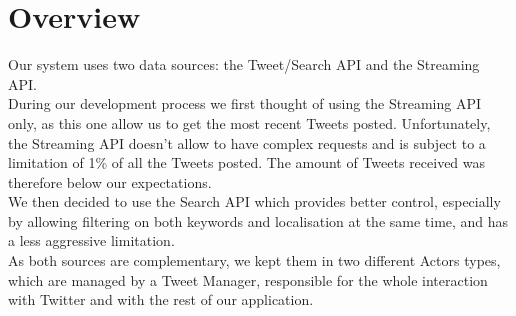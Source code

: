 \section{Overview}

Our system uses two data sources: the Tweet/Search API and the Streaming API.  \\
During our development process we first thought of using the Streaming API only, as this one allow us to get the most recent Tweets posted. Unfortunately, the Streaming API doesn't allow to have complex requests and is subject to a limitation of 1\% of all the Tweets posted. The amount of Tweets received was therefore below our expectations. \\
We then decided to use the Search API which provides better control, especially by allowing filtering on both keywords and localisation at the same time, and has a less aggressive limitation. \\
As both sources are complementary, we kept them in two different Actors types, which are managed by a Tweet Manager, responsible for the whole interaction with Twitter and with the rest of our application.